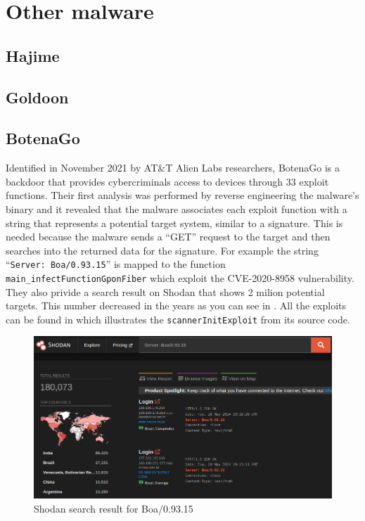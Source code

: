 \chapter{Other malware}

\section{Hajime}

\section{Goldoon}

\section{BotenaGo}

Identified in November 2021 by AT\&T Alien Labs researchers, BotenaGo is a backdoor that provides cybercriminals access to devices through 33 exploit functions. Their first analysis was performed by reverse engineering the malware's binary and it revealed that the malware associates each exploit function with a string that represents a potential target system, similar to a signature. This is needed because the malware sends a ``GET'' request to the target and then searches into the returned data for the signature. For example the string ``\texttt{Server: Boa/0.93.15}'' is mapped to the function \texttt{main\_infectFunctionGponFiber} which exploit the CVE-2020-8958 vulnerability. They also privide a search result on Shodan that shows 2 milion potential targets. This number decreased in the years as you can see in . All the exploits can be found in  which illustrates the \texttt{scannerInitExploit} from its source code.

\begin{figure}[ht]
    \centering
    \includegraphics[scale=0.4]{resources/images/boa-shodan.png}
    \caption{Shodan search result for Boa/0.93.15}
    \label{fig:boa-shodan}
\end{figure}

